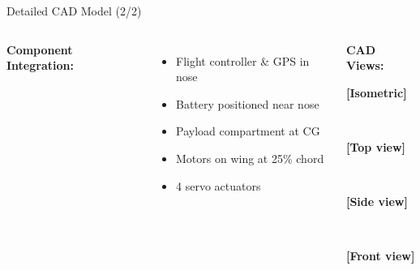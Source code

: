 \documentclass[aspectratio=169,18pt]{beamer}
\begin{document}
\begin{frame}{Detailed CAD Model (2/2)}

\begin{columns}[T]
\textbf{\color{navymain}Component Integration:}
\begin{itemize}
\item Flight controller \& GPS in nose
\item Battery positioned near nose
\item Payload compartment at CG
\item Motors on wing at 25\% chord
\item 4 servo actuators
\end{itemize}



\begin{center}
\textbf{\color{navymain}CAD Views:}\\
\vspace{0.15cm}
\colorbox{iceblue}{\parbox{0.9\textwidth}{\centering\small\textcolor{navymain}{\textbf{[Isometric]}}}}\\
\vspace{0.15cm}
\colorbox{iceblue}{\parbox{0.9\textwidth}{\centering\small\textcolor{navymain}{\textbf{[Top view]}}}}\\
\vspace{0.15cm}
\colorbox{iceblue}{\parbox{0.9\textwidth}{\centering\small\textcolor{navymain}{\textbf{[Side view]}}}}\\
\vspace{0.15cm}
\colorbox{iceblue}{\parbox{0.9\textwidth}{\centering\small\textcolor{navymain}{\textbf{[Front view]}}}}
\end{center}
\end{columns}
\end{frame}
\end{document}
